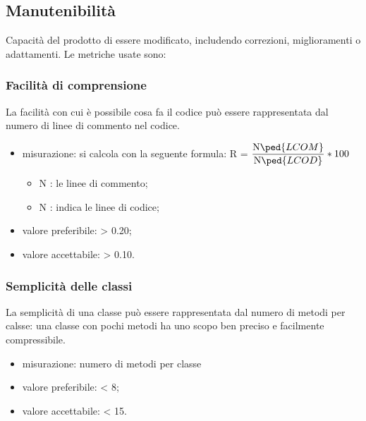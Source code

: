 \subsection{Manutenibilità}
Capacità del prodotto di essere modificato, includendo correzioni, miglioramenti o adattamenti.
Le metriche usate sono:
	\subsubsection{Facilità di comprensione}
	La facilità con cui è possibile cosa fa il codice può essere rappresentata dal numero di linee di commento nel codice.
	\begin{itemize}
	\item{misurazione: si calcola con la seguente formula: R = $\displaystyle\frac{\mbox{N}\ped{LCOM}}{\mbox{N}\ped{LCOD}}*100$ 
		\begin{itemize}
		\item{{N} : le linee di commento;}
		\item{{N} : indica le linee di codice;}
		\end{itemize}		
	}
	\item {valore preferibile: > 0.20;}
	\item {valore accettabile: > 0.10.}
	\end{itemize}
	\subsubsection{Semplicità delle classi}
	La semplicità di una classe può essere rappresentata dal numero di metodi per calsse: una classe con pochi metodi ha uno scopo ben preciso e facilmente compressibile.
	\begin{itemize}
	\item {misurazione: numero di metodi per classe}
	\item {valore preferibile: < 8;}
	\item {valore accettabile: < 15.}
	\end{itemize}